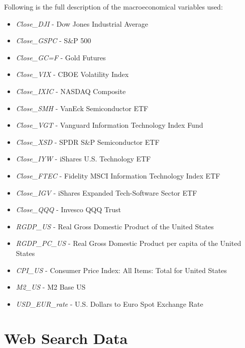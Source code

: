 Following is the full description of the macroeconomical
variables used:

\begin{itemize}
    \item \textit{Close\_DJI} - Dow Jones Industrial Average
    \item \textit{Close\_GSPC} - S\&P 500
    \item \textit{Close\_GC=F} - Gold Futures
    \item \textit{Close\_VIX} - CBOE Volatility Index
    \item \textit{Close\_IXIC} - NASDAQ Composite
    \item \textit{Close\_SMH} - VanEck Semiconductor ETF
    \item \textit{Close\_VGT} - Vanguard Information Technology Index Fund
    \item \textit{Close\_XSD} - SPDR S\&P Semiconductor ETF
    \item \textit{Close\_IYW} - iShares U.S. Technology ETF
    \item \textit{Close\_FTEC} - Fidelity MSCI Information Technology Index ETF
    \item \textit{Close\_IGV} - iShares Expanded Tech-Software Sector ETF
    \item \textit{Close\_QQQ} - Invesco QQQ Trust
    \item \textit{RGDP\_US} - Real Gross Domestic Product of the United States
    \item \textit{RGDP\_PC\_US} - Real Gross Domestic Product per capita 
    of the United States
    \item \textit{CPI\_US} - Consumer Price Index: All Items: Total for United States
    \item \textit{M2\_US} - M2 Base US
    \item \textit{USD\_EUR\_rate} - U.S. Dollars to Euro Spot Exchange Rate
\end{itemize}


\section{Web Search Data}

